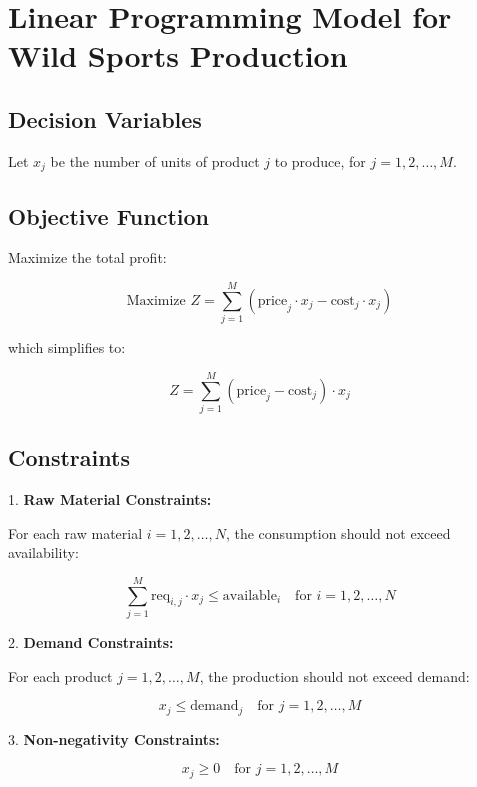 \documentclass{article}
\begin{document}
\section*{Linear Programming Model for Wild Sports Production}

\subsection*{Decision Variables}
Let \( x_j \) be the number of units of product \( j \) to produce, for \( j = 1, 2, \ldots, M \).

\subsection*{Objective Function}
Maximize the total profit:

\[
\text{Maximize } Z = \sum_{j=1}^{M} ( \text{price}_j \cdot x_j - \text{cost}_j \cdot x_j )
\]

which simplifies to:

\[
Z = \sum_{j=1}^{M} (\text{price}_j - \text{cost}_j) \cdot x_j
\]

\subsection*{Constraints}

1. \textbf{Raw Material Constraints:}

For each raw material \( i = 1, 2, \ldots, N \), the consumption should not exceed availability:

\[
\sum_{j=1}^{M} \text{req}_{i,j} \cdot x_j \leq \text{available}_i \quad \text{for } i = 1, 2, \ldots, N
\]

2. \textbf{Demand Constraints:}

For each product \( j = 1, 2, \ldots, M \), the production should not exceed demand:

\[
x_j \leq \text{demand}_j \quad \text{for } j = 1, 2, \ldots, M
\]

3. \textbf{Non-negativity Constraints:}

\[
x_j \geq 0 \quad \text{for } j = 1, 2, \ldots, M
\]
\end{document}

